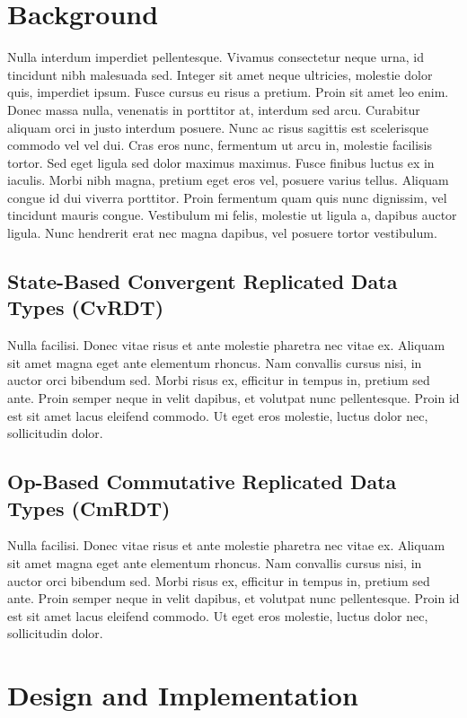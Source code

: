 \documentclass[sigconf,nonacm]{acmart}
\begin{document}
\section{Background}

Nulla interdum imperdiet pellentesque. Vivamus consectetur neque urna, id tincidunt nibh malesuada sed. Integer sit amet neque ultricies, molestie dolor quis, imperdiet ipsum. Fusce cursus eu risus a pretium. Proin sit amet leo enim. Donec massa nulla, venenatis in porttitor at, interdum sed arcu. Curabitur aliquam orci in justo interdum posuere. Nunc ac risus sagittis est scelerisque commodo vel vel dui. Cras eros nunc, fermentum ut arcu in, molestie facilisis tortor. Sed eget ligula sed dolor maximus maximus. Fusce finibus luctus ex in iaculis. Morbi nibh magna, pretium eget eros vel, posuere varius tellus. Aliquam congue id dui viverra porttitor. Proin fermentum quam quis nunc dignissim, vel tincidunt mauris congue. Vestibulum mi felis, molestie ut ligula a, dapibus auctor ligula. Nunc hendrerit erat nec magna dapibus, vel posuere tortor vestibulum.

\subsection{State-Based Convergent Replicated Data Types (CvRDT)}

Nulla facilisi. Donec vitae risus et ante molestie pharetra nec vitae ex. Aliquam sit amet magna eget ante elementum rhoncus. Nam convallis cursus nisi, in auctor orci bibendum sed. Morbi risus ex, efficitur in tempus in, pretium sed ante. Proin semper neque in velit dapibus, et volutpat nunc pellentesque. Proin id est sit amet lacus eleifend commodo. Ut eget eros molestie, luctus dolor nec, sollicitudin dolor.

\subsection{Op-Based Commutative Replicated Data Types (CmRDT)}

Nulla facilisi. Donec vitae risus et ante molestie pharetra nec vitae ex. Aliquam sit amet magna eget ante elementum rhoncus. Nam convallis cursus nisi, in auctor orci bibendum sed. Morbi risus ex, efficitur in tempus in, pretium sed ante. Proin semper neque in velit dapibus, et volutpat nunc pellentesque. Proin id est sit amet lacus eleifend commodo. Ut eget eros molestie, luctus dolor nec, sollicitudin dolor.

\section{Design and Implementation}
\end{document}
